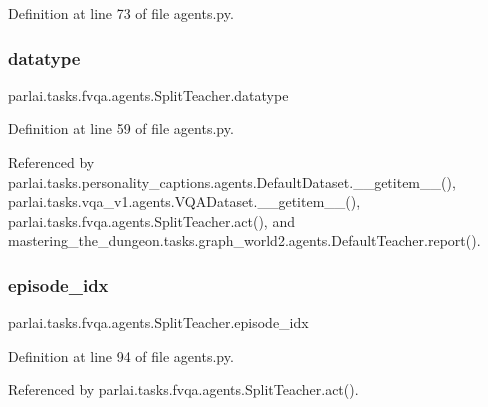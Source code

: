 Definition at line 73 of file agents.\+py.

\mbox{\label{classparlai_1_1tasks_1_1fvqa_1_1agents_1_1SplitTeacher_aef55c744ce7578bbe76da7523d38e9ab}} 
\subsubsection{\texorpdfstring{datatype}{datatype}}
{\footnotesize\ttfamily parlai.\+tasks.\+fvqa.\+agents.\+Split\+Teacher.\+datatype}



Definition at line 59 of file agents.\+py.



Referenced by parlai.\+tasks.\+personality\+\_\+captions.\+agents.\+Default\+Dataset.\+\_\+\+\_\+getitem\+\_\+\+\_\+(), parlai.\+tasks.\+vqa\+\_\+v1.\+agents.\+V\+Q\+A\+Dataset.\+\_\+\+\_\+getitem\+\_\+\+\_\+(), parlai.\+tasks.\+fvqa.\+agents.\+Split\+Teacher.\+act(), and mastering\+\_\+the\+\_\+dungeon.\+tasks.\+graph\+\_\+world2.\+agents.\+Default\+Teacher.\+report().

\mbox{\label{classparlai_1_1tasks_1_1fvqa_1_1agents_1_1SplitTeacher_a7aa1bdb6afaaca6321a86b1c80f64b5d}} 
\subsubsection{\texorpdfstring{episode\+\_\+idx}{episode\_idx}}
{\footnotesize\ttfamily parlai.\+tasks.\+fvqa.\+agents.\+Split\+Teacher.\+episode\+\_\+idx}



Definition at line 94 of file agents.\+py.



Referenced by parlai.\+tasks.\+fvqa.\+agents.\+Split\+Teacher.\+act().

